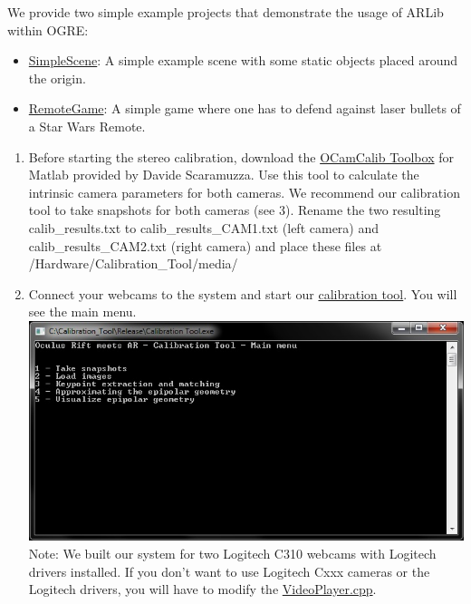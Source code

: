 \documentclass[]{article}
\begin{document}
We provide two simple example projects that demonstrate the usage of
ARLib within OGRE:

\begin{itemize}
\item
  \href{https://github.com/ands/OculusMeetsAR/wiki/SimpleScene}{SimpleScene}:
  A simple example scene with some static objects placed around the
  origin.
\item
  \href{https://github.com/ands/OculusMeetsAR/wiki/RemoteGame}{RemoteGame}:
  A simple game where one has to defend against laser bullets of a Star
  Wars Remote.
\end{itemize}

\begin{enumerate}
\def\labelenumi{\arabic{enumi}.}
\item
  Before starting the stereo calibration, download the
  \href{https://sites.google.com/site/scarabotix/ocamcalib-toolbox}{OCamCalib
  Toolbox} for Matlab provided by Davide Scaramuzza. Use this tool to
  calculate the intrinsic camera parameters for both cameras. We
  recommend our calibration tool to take snapshots for both cameras (see
  3). Rename the two resulting calib\_results.txt to
  calib\_results\_CAM1.txt (left camera) and calib\_results\_CAM2.txt
  (right camera) and place these files at
  /Hardware/Calibration\_Tool/media/
\item
  Connect your webcams to the system and start our
  \href{https://github.com/ands/OculusMeetsAR/tree/master/Hardware/Calibration_Tool}{calibration
  tool}. You will see the main menu.\\
  \includegraphics*{0.jpg}
  Note: We built our system for two Logitech C310 webcams with Logitech
  drivers installed. If you don't want to use Logitech Cxxx cameras or
  the Logitech drivers, you will have to modify the
  \href{https://github.com/ands/OculusMeetsAR/tree/master/ARLib/src/Video}{VideoPlayer.cpp}.

\end{enumerate}
\end{document}
